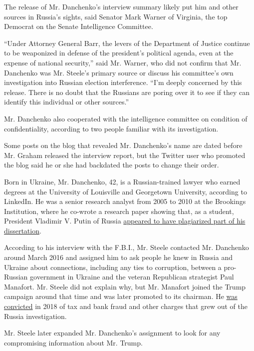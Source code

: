 The release of Mr. Danchenko's interview summary likely put him and
other sources in Russia's sights, said Senator Mark Warner of Virginia,
the top Democrat on the Senate Intelligence Committee.

``Under Attorney General Barr, the levers of the Department of Justice
continue to be weaponized in defense of the president's political
agenda, even at the expense of national security,'' said Mr. Warner, who
did not confirm that Mr. Danchenko was Mr. Steele's primary source or
discuss his committee's own investigation into Russian election
interference. ``I'm deeply concerned by this release. There is no doubt
that the Russians are poring over it to see if they can identify this
individual or other sources.''

Mr. Danchenko also cooperated with the intelligence committee on
condition of confidentiality, according to two people familiar with its
investigation.

Some posts on the blog that revealed Mr. Danchenko's name are dated
before Mr. Graham released the interview report, but the Twitter user
who promoted the blog said he or she had backdated the posts to change
their order.

Born in Ukraine, Mr. Danchenko, 42, is a Russian-trained lawyer who
earned degrees at the University of Louisville and Georgetown
University, according to LinkedIn. He was a senior research analyst from
2005 to 2010 at the Brookings Institution, where he co-wrote a research
paper showing that, as a student, President Vladimir V. Putin of Russia
\href{https://www.washingtonpost.com/news/answer-sheet/wp/2014/03/18/russias-plagiarism-problem-even-putin-has-done-it/}{appeared
to have plagiarized part of his dissertation}.

According to his interview with the F.B.I., Mr. Steele contacted Mr.
Danchenko around March 2016 and assigned him to ask people he knew in
Russia and Ukraine about connections, including any ties to corruption,
between a pro-Russian government in Ukraine and the veteran Republican
strategist Paul Manafort. Mr. Steele did not explain why, but Mr.
Manafort joined the Trump campaign around that time and was later
promoted to its chairman. He
\href{https://www.nytimes.com/2019/03/13/us/politics/paul-manafort-sentencing.html}{was
convicted} in 2018 of tax and bank fraud and other charges that grew out
of the Russia investigation.

Mr. Steele later expanded Mr. Danchenko's assignment to look for any
compromising information about Mr. Trump.

